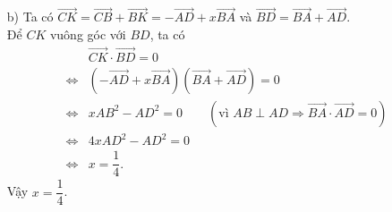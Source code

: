 \begin{bt}
{{
		}
		\begin{enumerate}
			\item[b)] Ta có $\vec{CK}=\vec{CB}+\vec{BK}=-\vec{AD}+x\vec{BA}$ và $\vec{BD}=\vec{BA}+\vec{AD}$.\\
			Để $CK$ vuông góc với $BD$, ta có
			\begin{eqnarray*}
				& & \vec{CK}\cdot \vec{BD}=0 \\
				&\Leftrightarrow& \left(-\vec{AD}+x\vec{BA}\right)\left(\vec{BA}+\vec{AD}\right)=0 \\
				&\Leftrightarrow& xAB^2-AD^2=0 \qquad(\text{vì }AB\perp AD\Rightarrow \vec{BA}\cdot\vec{AD}=0) \\
				&\Leftrightarrow& 4xAD^2-AD^2=0 \\
				&\Leftrightarrow& x=\dfrac{1}{4}.
			\end{eqnarray*}
			Vậy $x=\dfrac{1}{4}$.
		\end{enumerate}
	}
\end{bt}

